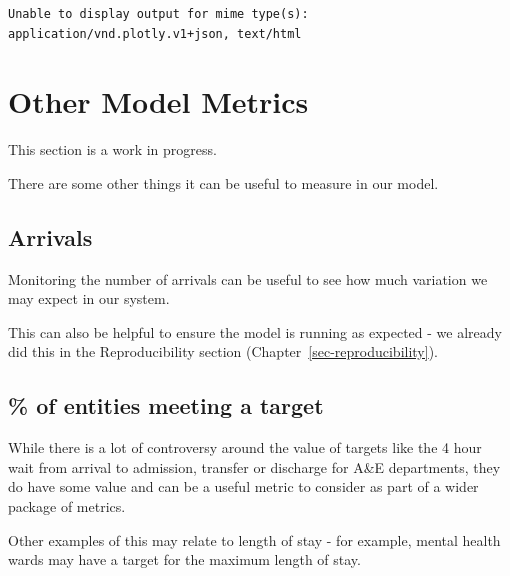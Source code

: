 \documentclass[
  letterpaper,
  DIV=11,
  numbers=noendperiod]{scrreprt}
\begin{document}
\begin{verbatim}
Unable to display output for mime type(s): application/vnd.plotly.v1+json, text/html
\end{verbatim}

\chapter{Other Model Metrics}\label{other-model-metrics}

\begin{tcolorbox}[enhanced jigsaw, colframe=quarto-callout-note-color-frame, bottomtitle=1mm, breakable, rightrule=.15mm, coltitle=black, colbacktitle=quarto-callout-note-color!10!white, opacityback=0, leftrule=.75mm, arc=.35mm, toptitle=1mm, title=\textcolor{quarto-callout-note-color}{\faInfo}\hspace{0.5em}{Note}, titlerule=0mm, colback=white, toprule=.15mm, bottomrule=.15mm, left=2mm, opacitybacktitle=0.6]

This section is a work in progress.

\end{tcolorbox}

There are some other things it can be useful to measure in our model.

\section{Arrivals}\label{arrivals}

Monitoring the number of arrivals can be useful to see how much
variation we may expect in our system.

This can also be helpful to ensure the model is running as expected - we
already did this in the Reproducibility section
(Chapter~\ref{sec-reproducibility}).

\section{\% of entities meeting a
target}\label{of-entities-meeting-a-target}

While there is a lot of controversy around the value of targets like the
4 hour wait from arrival to admission, transfer or discharge for A\&E
departments, they do have some value and can be a useful metric to
consider as part of a wider package of metrics.

Other examples of this may relate to length of stay - for example,
mental health wards may have a target for the maximum length of stay.
\end{document}
